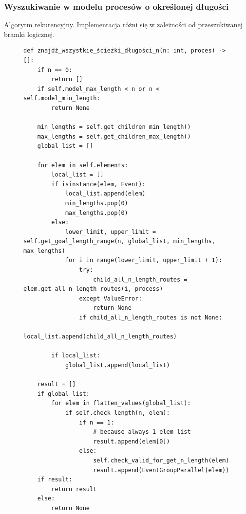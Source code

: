 \subsubsection{Wyszukiwanie w modelu procesów o określonej długości}

Algorytm rekurencyjny. Implementacja różni się w zależności od przeszukiwanej bramki logicznej.
\begin{figure}[!ht]
\lstset{caption=Wyszukiwanie procesów o długości n, captionpos=b}
\lstset{label=src:get_n_length, frame=single}
\begin{lstlisting}
def znajdź_wszystkie_ścieżki_długości_n(n: int, proces) -> []:
    if n == 0:
        return []
    if self.model_max_length < n or n < self.model_min_length:
        return None

    min_lengths = self.get_children_min_length()
    max_lengths = self.get_children_max_length()
    global_list = []

    for elem in self.elements:
        local_list = []
        if isinstance(elem, Event):
            local_list.append(elem)
            min_lengths.pop(0)
            max_lengths.pop(0)
        else:
            lower_limit, upper_limit = self.get_goal_length_range(n, global_list, min_lengths, max_lengths)
            for i in range(lower_limit, upper_limit + 1):
                try:
                    child_all_n_length_routes = elem.get_all_n_length_routes(i, process)
                except ValueError:
                    return None
                if child_all_n_length_routes is not None:
                    local_list.append(child_all_n_length_routes)

        if local_list:
            global_list.append(local_list)

    result = []
    if global_list:
        for elem in flatten_values(global_list):
            if self.check_length(n, elem):
                if n == 1:
                    # because always 1 elem list
                    result.append(elem[0])
                else:
                    self.check_valid_for_get_n_length(elem)
                    result.append(EventGroupParallel(elem))
    if result:
        return result
    else:
        return None
\end{lstlisting}
\end{figure}

